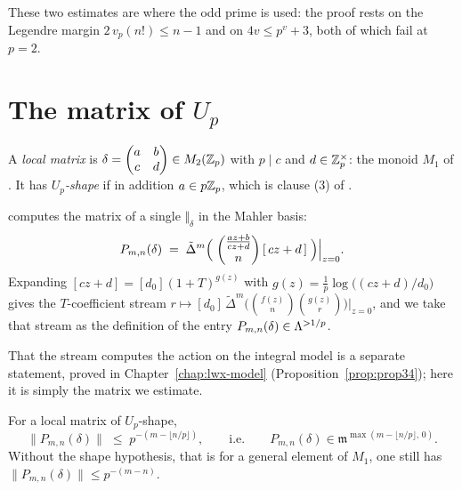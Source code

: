 These two estimates are where the odd prime is used: the proof rests on the Legendre margin
$2\,v_p(n!)\leq n-1$ and on $4v\leq p^{v}+3$, both of which fail at $p=2$.

\section{The matrix of $U_p$}

\begin{definition}
  \label{def:localmat}
  \leanok
  A \emph{local matrix} is $\delta = \begin{pmatrix} a & b\\ c& d\end{pmatrix}\in M_2(\mathbb{Z}_p)$ with
  $p \mid c$ and $d \in \mathbb{Z}_p^{\times}$: the monoid $M_1$ of \cite[(2.3.3)]{LWX}.  It has
  \emph{$U_p$-shape} if in addition $a \in p\mathbb{Z}_p$, which is clause (3) of
  \cite[Proposition 3.1]{LWX}.
\end{definition}

\begin{definition}
  \label{def:entry}
  \leanok
  \cite[Proposition 3.4]{LWX} computes the matrix of a single $\Vert_\delta$ in the Mahler basis:
  \[
    P_{m,n}(\delta) \;=\; \tilde\Delta^{m}\Bigl(\;\binom{\tfrac{az+b}{cz+d}}{n}\,[\,cz+d\,]\;
    \Bigr)\Big|_{z=0} .
  \]
  Expanding $[cz+d] = [d_0](1+T)^{g(z)}$ with $g(z) = \tfrac1p\log\bigl((cz+d)/d_0\bigr)$ gives
  the $T$-coefficient stream
  $r \mapsto [d_0]\,\tilde\Delta^{m}\bigl(\binom{f(z)}{n}\binom{g(z)}{r}\bigr)\big|_{z=0}$,
  and we take that stream as the definition of the entry $P_{m,n}(\delta)\in\Lambda^{>1/p}$.
\end{definition}

That the stream computes the action on the integral model is a separate statement, proved in
Chapter~\ref{chap:lwx-model} (Proposition~\ref{prop:prop34}); here it is simply the matrix we
estimate.

\begin{proposition}
  \label{prop:entry-bound}
  \leanok
  For a local matrix of $U_p$-shape,
  \[
    \bigl\lVert P_{m,n}(\delta)\bigr\rVert \;\leq\; p^{-(m - \lfloor n/p\rfloor)},
    \qquad\text{i.e.}\qquad
    P_{m,n}(\delta) \in \mathfrak{m}^{\max(m-\lfloor n/p\rfloor,\,0)} .
  \]
  Without the shape hypothesis, that is for a general element of $M_1$, one still has
  $\lVert P_{m,n}(\delta)\rVert \leq p^{-(m-n)}$.
\end{proposition}

